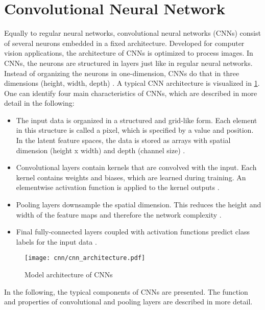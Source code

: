 \section{Convolutional Neural Network}

Equally to regular neural networks, convolutional neural networks (CNNs) consist of several neurons embedded in a fixed architecture. Developed for computer vision applications, the architecture of CNNs is optimized to process images. In CNNs, the neurons are structured in layers just like in regular neural networks. Instead of organizing the neurons in one-dimension, CNNs do that in three dimensions (height, width, depth) \cite{OShea2015}. A typical CNN architecture is visualized in \ref{fig:CNN_overview}. One can identify four main characteristics of CNNs, which are described in more detail in the following:

\begin{itemize}
    \item [1.] The input data is organized in a structured and grid-like form. Each element in this structure is called a pixel, which is specified by a value and position. In the latent feature spaces, the data is stored as arrays with spatial dimension (height x width) and depth (channel size) \cite{OShea2015}.
    
    \item [2.] Convolutional layers contain kernels that are convolved with the input. Each kernel contains weights and biases, which are learned during training. An elementwise activation function is applied to the kernel outputs \cite{OShea2015}.
    
    \item [3.]  Pooling layers downsample the spatial dimension. This reduces the height and width of the feature maps and therefore the network complexity \cite{OShea2015}.
    
    \item [4.] Final fully-connected layers coupled with activation functions predict class labels for the input data \cite{OShea2015}.
\end{itemize}

\begin{figure}[H]
  \centering
  \texttt{[image: cnn/cnn\_architecture.pdf]}
  \caption {Model architecture of CNNs \cite{OShea2015}}
  \label{fig:CNN_overview}
\end{figure}

In the following, the typical components of CNNs are presented. The function and properties of convolutional and pooling layers are described in more detail.

